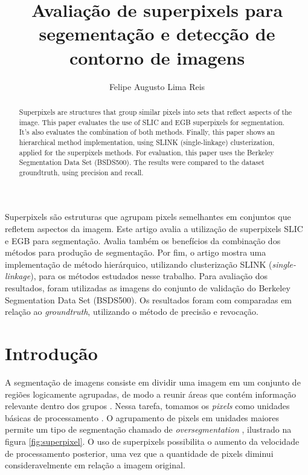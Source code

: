 \title{Avaliação de superpixels para segementação e detecção de contorno de imagens}
\author{Felipe Augusto Lima Reis\inst{1}}
\begin{document}
 

\maketitle

\begin{abstract}
  Superpixels are structures that group similar pixels into sets that reflect aspects of the image. This paper evaluates the use of SLIC and EGB superpixels for segmentation. It's also evaluates the combination of both methods. Finally, this paper shows an hierarchical method implementation, using SLINK (single-linkage) clusterization, applied for the superpixels methods. For evaluation, this paper uses the Berkeley Segmentation Data Set (BSDS500). The results were compared to the dataset groundtruth, using precision and recall.
\end{abstract}
     
\begin{resumo} 
  Superpixels são estruturas que agrupam pixels semelhantes em conjuntos que refletem aspectos da imagem. Este artigo avalia a utilização de superpixels SLIC e EGB para segmentação. Avalia também os benefícios da combinação dos métodos para produção de segmentação. Por fim, o artigo mostra uma implementação de método hierárquico, utilizando clusterização SLINK (\textit{single-linkage}), para os métodos estudados nesse trabalho. Para avaliação dos resultados, foram utilizadas as imagens do conjunto de validação do Berkeley Segmentation Data Set (BSDS500). Os resultados foram com comparadas em relação ao \textit{groundtruth}, utilizando o método de precisão e revocação.
\end{resumo}


\section{Introdução} \label{sec:introducao}

A segmentação de imagens consiste em dividir uma imagem em um conjunto de regiões logicamente agrupadas, de modo a reunir áreas que contém informação relevante dentro dos grupos \cite{DOMINGUEZ}. Nessa tarefa, tomamos os \textit{pixels} como unidades básicas de processamento \cite{WANG201728}. O agrupamento de pixels em unidades maiores permite um tipo de segmentação chamado de \textit{oversegmentation} \cite{WANG201728}, ilustrado na figura \ref{fig:superpixel}. O uso de superpixels possibilita o aumento da velocidade de processamento posterior, uma vez que a quantidade de pixels diminui consideravelmente em relação a imagem original.
\end{document}
